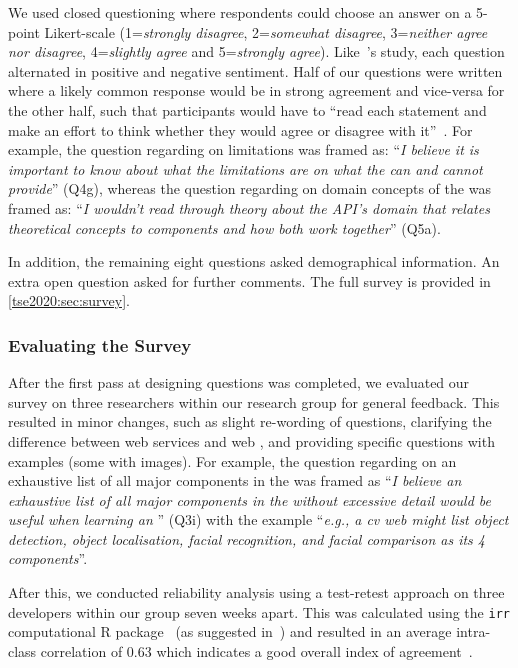  We used closed questioning where respondents could choose an answer on a 5-point Likert-scale (1=\textit{strongly disagree}, 2=\textit{somewhat disagree}, 3=\textit{neither agree nor disagree}, 4=\textit{slightly agree} and 5=\textit{strongly agree}).  Like~\citeauthor{Brooke:1996ua}'s study, each question alternated in positive and negative sentiment. Half of our questions were written where a likely common response would be in strong agreement and vice-versa for the other half, such that participants would have to ``read each statement and make an effort to think whether they would agree or disagree with it''~\citep{Brooke:1996ua}. For example, the question regarding  on  limitations was framed as: ``\textit{I believe it is important to know about what the limitations are on what the  can and cannot provide}'' (Q4g), whereas the question regarding  on domain concepts of the  was framed as: ``\textit{I wouldn't read through theory about the API's domain that relates theoretical concepts to  components and how both work together}'' (Q5a). 
 
 In addition, the remaining eight questions asked demographical information. An extra open question asked for further comments. The full survey is provided in \cref{tse2020:sec:survey}.

\subsubsection{Evaluating the Survey}
\label{tse2020:sec:validation:survey:eval}

After the first pass at designing questions was completed, we evaluated our survey on three researchers within our research group for general feedback. This resulted in minor changes, such as slight re-wording of questions, clarifying the difference between web services and web , and providing specific questions with examples (some with images). For example, the question regarding  on an exhaustive list of all major components in the  was framed as ``\textit{I believe an exhaustive list of all major components in the  without excessive detail would be useful when learning an }'' (Q3i) with the example ``\textit{e.g., a \gls{cv} web  might list object detection, object localisation, facial recognition, and facial comparison as its 4 components}''.

After this, we conducted reliability analysis using a test-retest approach on three developers within our group seven weeks apart.  This was calculated using the \texttt{irr} computational R package~\citep{Gamer:tj} (as suggested in~\citep{Hallgren:2012kt}) and  resulted in an average intra-class correlation of 0.63 which indicates a good overall index of agreement~\citep{cicchetti1994guidelines}.

